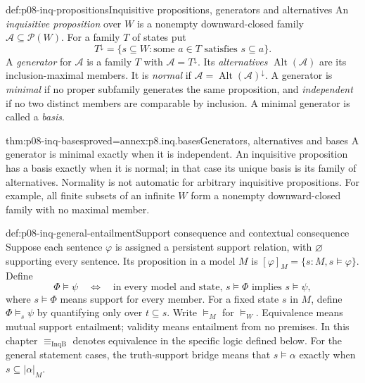 \begin{hbdefinition}{def:p08-inq-propositions}{Inquisitive propositions, generators and alternatives}
An \emph{inquisitive proposition} over \(W\) is a nonempty downward-closed
family \(\mathcal A\subseteq\mathcal P(W)\). For a family \(T\) of states put
\[
 T^\downarrow=\{s\subseteq W:\text{some }a\in T\text{ satisfies }s\subseteq a\}.
\]
A \emph{generator} for \(\mathcal A\) is a family \(T\) with
\(\mathcal A=T^\downarrow\). Its \emph{alternatives}
\(\operatorname{Alt}(\mathcal A)\) are its inclusion-maximal members.
It is \emph{normal} if
\(\mathcal A=\operatorname{Alt}(\mathcal A)^\downarrow\).
A generator is \emph{minimal} if no proper subfamily generates the same
proposition, and \emph{independent} if no two distinct members are comparable
by inclusion. A minimal generator is called a \emph{basis}.
\end{hbdefinition}

\begin{hblemma}{thm:p08-inq-bases}{proved=annex:p8.inq.bases}{Generators, alternatives and bases}
A generator is minimal exactly when it is independent. An inquisitive
proposition has a basis exactly when it is normal; in that case its unique
basis is its family of alternatives. Normality is not automatic for arbitrary
inquisitive propositions. For example, all finite subsets of an infinite
\(W\) form a nonempty downward-closed family with no maximal member.
\end{hblemma}

\begin{hbdefinition}{def:p08-inq-general-entailment}{Support consequence and contextual consequence}
Suppose each sentence \(\varphi\) is assigned a persistent support relation,
with \(\varnothing\) supporting every sentence. Its proposition in a model
\(M\) is \([\varphi]_M=\{s:M,s\models\varphi\}\). Define
\[
 \Phi\models\psi
 \quad\Longleftrightarrow\quad
 \text{in every model and state, }s\models\Phi\text{ implies }s\models\psi,
\]
where \(s\models\Phi\) means support for every member. For a fixed state
\(s\) in \(M\), define \(\Phi\models_s\psi\) by quantifying only over
\(t\subseteq s\). Write \(\models_M\) for \(\models_W\).
Equivalence means mutual support entailment; validity means entailment from
no premises. In this chapter \(\equiv_{\mathrm{InqB}}\) denotes equivalence
in the specific logic defined below.
For the general statement cases, the truth-support bridge means that
\(s\models\alpha\) exactly when \(s\subseteq|\alpha|_M\).
\end{hbdefinition}

